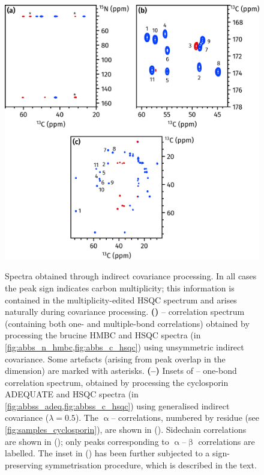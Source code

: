 \documentclass[a4paper,12pt]{article}
\newcommand{\proton}{\ch{^{1}H}}
\newcommand{\carbon}{\ch{^{13}C}}
\newcommand{\nitrogen}{\ch{^{15}N}}
\begin{document}
\begin{refsection}
\begin{figure}[ht]
    \centering
    \includegraphics[]{covariance.png}%
    {\label{fig:covariance_brucine_nc}}
    {\label{fig:covariance_cyclo_caco}}
    {\label{fig:covariance_cyclo_sidechain}}
    \caption{
        Spectra obtained through indirect covariance processing.
        In all cases the peak sign indicates carbon multiplicity; this information is contained in the multiplicity-edited \carbon{} HSQC spectrum and arises naturally during covariance processing.
        \textbf{()} \carbon{}--\nitrogen{} correlation spectrum (containing both one- and multiple-bond correlations) obtained by processing the brucine \nitrogen{} HMBC and \carbon{} HSQC spectra (in \cref{fig:abbs_n_hmbc,fig:abbs_c_hsqc}) using unsymmetric indirect covariance.
        Some artefacts (arising from peak overlap in the \proton{} dimension) are marked with asterisks.
        \textbf{(--)} Insets of \carbon{}--\carbon{} one-bond correlation spectrum, obtained by processing the cyclosporin ADEQUATE and \carbon{} HSQC spectra (in \cref{fig:abbss_adeq,fig:abbss_c_hsqc}) using generalised indirect covariance ($\lambda = 0.5$).
        The $\upalpha$-- correlations, numbered by residue (see \cref{fig:samples_cyclosporin}), are shown in ().
        Sidechain  correlations are shown in (); only peaks corresponding to $\upalpha$--$\upbeta$ correlations are labelled.
        The inset in () has been further subjected to a sign-preserving symmetrisation procedure, which is described in the text.
    }
    \label{fig:covariance}
\end{figure}


\end{refsection}
\end{document}
